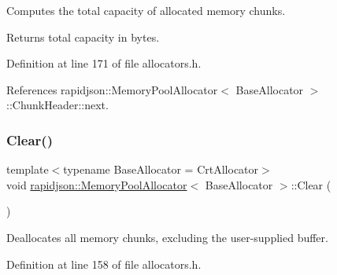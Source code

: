 Computes the total capacity of allocated memory chunks. 

\begin{DoxyReturn}{Returns}
total capacity in bytes. 
\end{DoxyReturn}


Definition at line 171 of file allocators.\+h.


\begin{DoxyCode}{0}

\end{DoxyCode}


References rapidjson\+::\+Memory\+Pool\+Allocator$<$ Base\+Allocator $>$\+::\+Chunk\+Header\+::next.

\mbox{\label{classrapidjson_1_1_memory_pool_allocator_aa050d52c62503ca6d6f66289ce83a18e}} 
\subsubsection{\texorpdfstring{Clear()}{Clear()}}
{\footnotesize\ttfamily template$<$typename Base\+Allocator = Crt\+Allocator$>$ \\
void \mbox{\hyperlink{classrapidjson_1_1_memory_pool_allocator}{rapidjson\+::\+Memory\+Pool\+Allocator}}$<$ Base\+Allocator $>$\+::Clear (\begin{DoxyParamCaption}{ }\end{DoxyParamCaption})}



Deallocates all memory chunks, excluding the user-\/supplied buffer. 



Definition at line 158 of file allocators.\+h.


